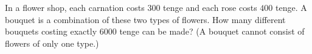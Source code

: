 In a flower shop, each carnation costs $300$ tenge and each rose costs $400$ tenge. A bouquet is a combination of these two types of flowers. How many different bouquets costing exactly $6000$ tenge can be made? (A bouquet cannot consist of flowers of only one type.)
